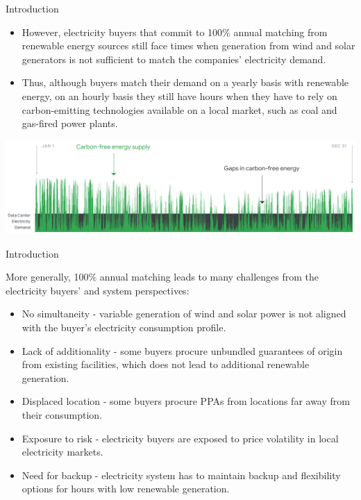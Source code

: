 \begin{frame}{Introduction}
  
    \begin{itemize}
    \item However, electricity buyers that commit to 100\% annual matching 
    from renewable energy sources still face times when generation 
    from wind and solar generators is not sufficient to match 
    the companies’ electricity demand. 
    \item Thus, although buyers match their demand on a \alert{yearly} basis with 
    renewable energy, on an \alert{hourly} basis they still have hours 
    when they have to rely on carbon-emitting technologies available 
    on a local market, such as coal and gas-fired power plants.
    \end{itemize}

  \centering
  \includegraphics[width=14cm]{images/google-year.png}
           
\end{frame}


\begin{frame}{Introduction}
  
  More generally, 100\% annual matching leads to many challenges 
  from the electricity buyers' and system perspectives: 
  \begin{itemize}
  \item No \alert{simultaneity} - variable generation of wind and solar power is not aligned with the 
  buyer’s electricity consumption profile.
  \item Lack of \alert{additionality} - some buyers procure unbundled guarantees of origin from existing 
  facilities, which does not lead to additional renewable generation.
  \item Displaced \alert{location} - some buyers procure  PPAs from locations far away from their consumption.
  \item Exposure to \alert{risk} - electricity buyers are exposed to price volatility 
  in local electricity markets.
  \item Need for \alert{backup} - electricity system has to maintain backup and flexibility options 
  for hours with low renewable generation.
  \end{itemize}
  
\end{frame}


